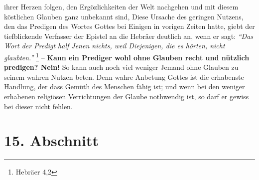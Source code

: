 ihrer Herzen folgen, den Ergözlichkeiten der Welt nachgehen und mit diesem
köstlichen Glauben ganz unbekannt sind, Diese Ursache des geringen Nutzens, den
das Predigen  des Wortes Gottes bei Einigen in vorigen Zeiten
hatte, giebt der
tiefblickende Verfasser der Epistel an die Hebräer
deutlich an, wenn er sagt:
\textit{"`Das Wort der Predigt half Jenen nichts, weil
Diejenigen, die es hörten, nicht glaubten."'}
\footnote{Hebräer 4,2}
-- \textbf{Kann
ein
Prediger wohl ohne Glauben recht und nützlich predigen? Nein!} So kann auch noch
viel weniger Jemand ohne Glauben zu seinem wahren Nutzen beten. Denn wahre
Anbetung Gottes ist die erhabenste Handlung, der dass Gemüth des Menschen fähig
ist; und wenn bei den weniger erhabenen religiösen Verrichtungen der Glaube
nothwendig ist, so darf er gewiss bei dieser nicht fehlen.

\section{15. Abschnitt} \label{kap6_ab15}

